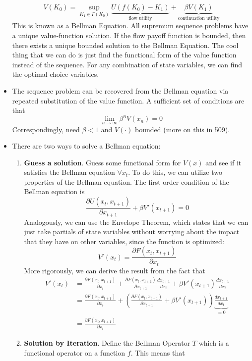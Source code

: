 \documentclass[12pt]{article}
\begin{document}
\begin{itemize}
    \[V(K_0) = \sup_{K_1 \in \Gamma(K_0)}\underbrace{U(f(K_0) - K_1)}_{\text{flow utility}} + \underbrace{\beta V(K_1)}_{\text{continuation utility}}\]
    This is known as a Bellman Equation. All supremum sequence problems have a unique value-function solution. If the flow payoff function is bounded, then there exists a unique bounded solution to the Bellman Equation. The cool thing that we can do is just find the functional form of the value function instead of the sequence. For any combination of state variables, we can find the optimal choice variables.
    \item The sequence problem can be recovered from the Bellman equation via repeated substitution of the value function. A sufficient set of conditions are that 
    \[\lim_{n\to\infty} \beta^nV(x_n) = 0\]
    Correspondingly, need $\beta < 1$ and $V(\cdot)$ bounded (more on this in 509). 
    \item There are two ways to solve a Bellman equation:
    \begin{enumerate}
        \item \textbf{Guess a solution}. Guess some functional form for $V(x)$ and see if it satisfies the Bellman equation $\forall x_t$. To do this, we can utilize two properties of the Bellman equation. The first order condition of the Bellman equation is
        \[\frac{\partial U(x_t, x_{t+1})}{\partial x_{t+1}} + \beta V'(x_{t+1}) = 0\]
        Analogously, we can use the Envelope Theorem, which states that we can just take partials of state variables without worrying about the impact that they have on other variables, since the function is optimized:
        \[V'(x_t) = \frac{\partial F(x_t, x_{t+1})}{\partial x_t}\]
        More rigorously, we can derive the result from the fact that
        \[\begin{split}
            V'(x_t) &= \frac{\partial F(x_t, x_{t+1})}{\partial x_t} + \frac{\partial F(x_t, x_{t+1})}{\partial x_{t+1}}\frac{d x_{t+1}}{dx_t} + \beta V'(x_{t+1})\frac{dx_{t+1}}{dx_t} \\
            &= \frac{\partial F(x_t, x_{t+1})}{\partial x_t} + \left(\frac{\partial F(x_t, x_{t+1})}{\partial x_{t+1}} + \beta V'(x_{t+1})\right)\underbrace{\frac{dx_{t+1}}{dx_t}}_{=0} \\
            &= \frac{\partial F(x_t, x_{t+1})}{\partial x_t}
        \end{split}\]
        \item \textbf{Solution by Iteration}. Define the Bellman Operator $T$ which is a functional operator on a function $f$. This means that

\end{enumerate}
\end{itemize}
\end{document}
